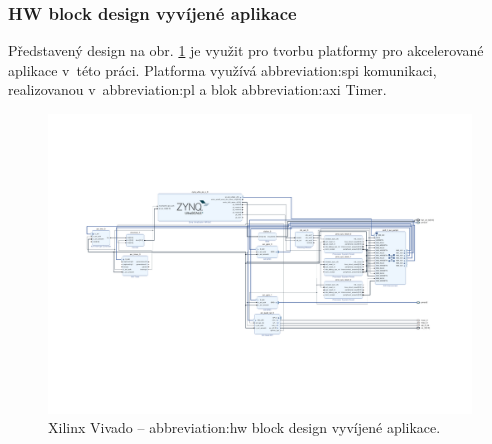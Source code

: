 \documentclass[a4paper, twoside, 11pt]{article}
\newcommand{\fbar}{\FloatBarrier}
\begin{document}
			\subsubsection{HW block design vyvíjené aplikace}\label{subsubsec:hw-block-design-vyvijene-aplikace}
				Představený design na obr. \ref{fig:kr-26-xilinx-vivado-hw-block-design} je využit pro tvorbu platformy pro akcelerované aplikace v~této práci. Platforma využívá \gls{abbreviation:spi} komunikaci, realizovanou v~\gls{abbreviation:pl} a blok \gls{abbreviation:axi} Timer.\par
			\begin{figure}[htbp!]
				\centering
				\includegraphics[width=0.78\paperheight, angle=90, origin=c]{src/pdf/kr-26-xilinx-vivado-hw-block-design.pdf}
				\caption{Xilinx Vivado – \gls{abbreviation:hw} block design vyvíjené aplikace.}
				\label{fig:kr-26-xilinx-vivado-hw-block-design}
			\end{figure}


	\fbar
\end{document}
